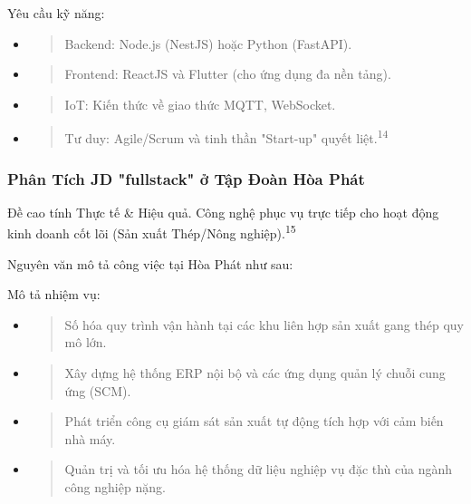 \documentclass[12pt,a4paper]{article}
\begin{document}
Yêu cầu kỹ năng:
\begin{itemize}
\item
  \begin{quote}
  Backend: Node.js (NestJS) hoặc Python (FastAPI).
  \end{quote}
\item
  \begin{quote}
  Frontend: ReactJS và Flutter (cho ứng dụng đa nền tảng).
  \end{quote}
\item
  \begin{quote}
  IoT: Kiến thức về giao thức MQTT, WebSocket.
  \end{quote}
\item
  \begin{quote}
  Tư duy: Agile/Scrum và tinh thần "Start-up" quyết liệt.\textsuperscript{14}
  \end{quote}
\end{itemize}

\subsubsection{Phân Tích JD "fullstack" ở Tập Đoàn Hòa Phát}

Đề cao tính Thực tế \& Hiệu quả. Công nghệ phục vụ trực tiếp cho hoạt động kinh doanh cốt lõi (Sản xuất Thép/Nông nghiệp).\textsuperscript{15}

Nguyên văn mô tả công việc tại Hòa Phát như sau:

Mô tả nhiệm vụ:
\begin{itemize}
\item
  \begin{quote}
  Số hóa quy trình vận hành tại các khu liên hợp sản xuất gang thép quy mô lớn.
  \end{quote}
\item
  \begin{quote}
  Xây dựng hệ thống ERP nội bộ và các ứng dụng quản lý chuỗi cung ứng (SCM).
  \end{quote}
\item
  \begin{quote}
  Phát triển công cụ giám sát sản xuất tự động tích hợp với cảm biến nhà máy.
  \end{quote}
\item
  \begin{quote}
  Quản trị và tối ưu hóa hệ thống dữ liệu nghiệp vụ đặc thù của ngành công nghiệp nặng.
  \end{quote}
\end{itemize}
\end{document}
